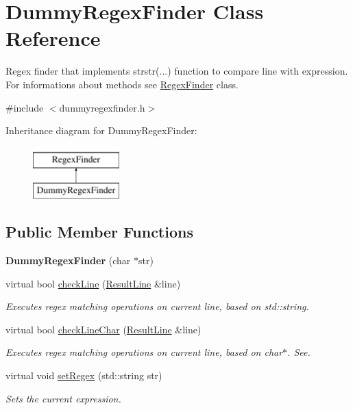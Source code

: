 \hypertarget{class_dummy_regex_finder}{\section{Dummy\-Regex\-Finder Class Reference}
\label{class_dummy_regex_finder}
}


Regex finder that implements strstr(...) function to compare line with expression. For informations about methods see \hyperlink{class_regex_finder}{Regex\-Finder} class.  




{\ttfamily \#include $<$dummyregexfinder.\-h$>$}

Inheritance diagram for Dummy\-Regex\-Finder\-:\begin{figure}[H]
\begin{center}
\leavevmode
\includegraphics[height=2.000000cm]{class_dummy_regex_finder}
\end{center}
\end{figure}
\subsection*{Public Member Functions}
\begin{DoxyCompactItemize}
\item 
\hypertarget{class_dummy_regex_finder_ab0fad30f0fc220c6186d6349d6179360}{{\bfseries Dummy\-Regex\-Finder} (char $\ast$str)}\label{class_dummy_regex_finder_ab0fad30f0fc220c6186d6349d6179360}

\item 
virtual bool \hyperlink{class_dummy_regex_finder_a8948007dfcb2faf9d2da2d411e8d7b2a}{check\-Line} (\hyperlink{class_result_line}{Result\-Line} \&line)
\begin{DoxyCompactList}\small\item\em Executes regex matching operations on current line, based on std\-::string. \end{DoxyCompactList}\item 
virtual bool \hyperlink{class_dummy_regex_finder_aa6f38077d53d03f4ccfeb1a541931ae5}{check\-Line\-Char} (\hyperlink{class_result_line}{Result\-Line} \&line)
\begin{DoxyCompactList}\small\item\em Executes regex matching operations on current line, based on char$\ast$. See. \end{DoxyCompactList}\item 
virtual void \hyperlink{class_dummy_regex_finder_ab1c0df0a928af04459f339f483243ce0}{set\-Regex} (std\-::string str)
\begin{DoxyCompactList}\small\item\em Sets the current expression. \end{DoxyCompactList}\end{DoxyCompactItemize}


